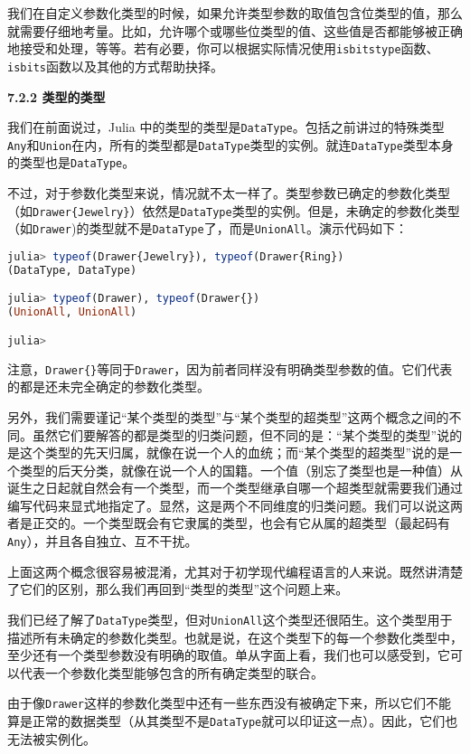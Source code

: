 我们在自定义参数化类型的时候，如果允许类型参数的取值包含位类型的值，那么就需要仔细地考量。比如，允许哪个或哪些位类型的值、这些值是否都能够被正确地接受和处理，等等。若有必要，你可以根据实际情况使用\verb`isbitstype`函数、\verb`isbits`函数以及其他的方式帮助抉择。

\textbf{7.2.2 类型的类型}

我们在前面说过，Julia 中的类型的类型是\verb`DataType`。包括之前讲过的特殊类型\verb`Any`和\verb`Union`在内，所有的类型都是\verb`DataType`类型的实例。就连\verb`DataType`类型本身的类型也是\verb`DataType`。

不过，对于参数化类型来说，情况就不太一样了。类型参数已确定的参数化类型（如\verb`Drawer{Jewelry}`）依然是\verb`DataType`类型的实例。但是，未确定的参数化类型（如\verb`Drawer`)的类型就不是\verb`DataType`了，而是\verb`UnionAll`。演示代码如下：
\begin{lstlisting}[language=julia]
julia> typeof(Drawer{Jewelry}), typeof(Drawer{Ring})
(DataType, DataType)

julia> typeof(Drawer), typeof(Drawer{})
(UnionAll, UnionAll)

julia> 
\end{lstlisting}

注意，\verb`Drawer{}`等同于\verb`Drawer`，因为前者同样没有明确类型参数的值。它们代表的都是还未完全确定的参数化类型。

另外，我们需要谨记“某个类型的类型”与“某个类型的超类型”这两个概念之间的不同。虽然它们要解答的都是类型的归类问题，但不同的是：“某个类型的类型”说的是这个类型的先天归属，就像在说一个人的血统；而“某个类型的超类型”说的是一个类型的后天分类，就像在说一个人的国籍。一个值（别忘了类型也是一种值）从诞生之日起就自然会有一个类型，而一个类型继承自哪一个超类型就需要我们通过编写代码来显式地指定了。显然，这是两个不同维度的归类问题。我们可以说这两者是正交的。一个类型既会有它隶属的类型，也会有它从属的超类型（最起码有\verb`Any`），并且各自独立、互不干扰。

上面这两个概念很容易被混淆，尤其对于初学现代编程语言的人来说。既然讲清楚了它们的区别，那么我们再回到“类型的类型”这个问题上来。

我们已经了解了\verb`DataType`类型，但对\verb`UnionAll`这个类型还很陌生。这个类型用于描述所有未确定的参数化类型。也就是说，在这个类型下的每一个参数化类型中，至少还有一个类型参数没有明确的取值。单从字面上看，我们也可以感受到，它可以代表一个参数化类型能够包含的所有确定类型的联合。

由于像\verb`Drawer`这样的参数化类型中还有一些东西没有被确定下来，所以它们不能算是正常的数据类型（从其类型不是\verb`DataType`就可以印证这一点）。因此，它们也无法被实例化。


